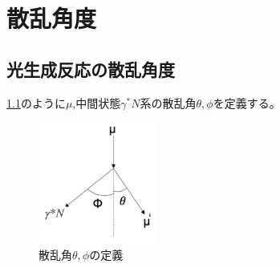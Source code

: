 \chapter{散乱角度}\label{cha:angle}
\section{光生成反応の散乱角度}
\ref{fig:angle1}のように$\mu$,中間状態$\gamma^*N$系の散乱角$\theta, \phi$を定義する。
\begin{figure}[H]
    \centering
    \includegraphics[height=4cm]{img/angle_diagram.png}
    \caption{散乱角$\theta, \phi$の定義}
    \label{fig:angle1}
\end{figure}

